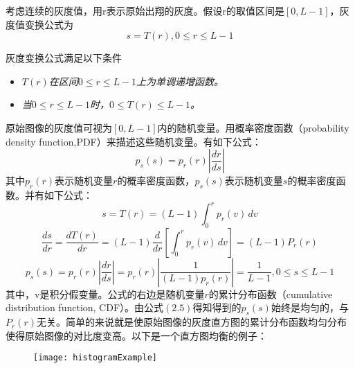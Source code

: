 考虑连续的灰度值，用r表示原始出翔的灰度。假设r的取值区间是$[0,L-1]$，灰度值变换公式为
\begin{equation}s=T(r),0 \leq r\leq L-1 \end{equation}

灰度变换公式满足以下条件
			\begin{itemize}
				\item \emph{$T(r)$在区间$0\leq r\leq L-1$上为单调递增函数。}
				\item \emph{当$0\leq r\leq L-1$时，$0\leq T(r) \leq L-1$。}
			\end{itemize}

原始图像的灰度值可视为$[0,L-1]$内的随机变量。用概率密度函数（probability density function,PDF）来描述这些随机变量。有如下公式：
\begin{equation}p_s(s)=p_r(r)|\frac{dr}{ds}|\end{equation}	
其中$p_r(r)$表示随机变量$r$的概率密度函数，$p_s(s)$表示随机变量$s$的概率密度函数。并有如下公式：
\begin{equation}     s=T(r)=(L-1)\int_0^r p_r(v)\,dv    \end{equation}	
\begin{equation}     \frac{ds}{dr}=\frac{dT(r)}{dr}=(L-1)\frac{d}{dr}\left[\int_0^r p_r(v)\,dv 	\right]=(L-1)P_r(r)     \end{equation}
\begin{equation}     p_s(s)=p_r(r) \left| \frac{dr}{ds}\right| =p_r(r) \left| \frac{1}{(L-1)p_r(r)} \right| = \frac{1}{L-1},0 \leq s \leq L-1    \end{equation}
其中，v是积分假变量。公式的右边是随机变量$r$的累计分布函数（cumulative distribution function, CDF）。由公式$(2.5)$得知得到的$p_s(s)$始终是均匀的，与$P_r(r)$无关。简单的来说就是使原始图像的灰度直方图的累计分布函数均匀分布使得原始图像的对比度变高。以下是一个直方图均衡的例子：

\begin{figure}[htb!]
    \centering
    \texttt{[image: histogramExample]}
    \label{fig:tc_q_criteria}
\end{figure}

